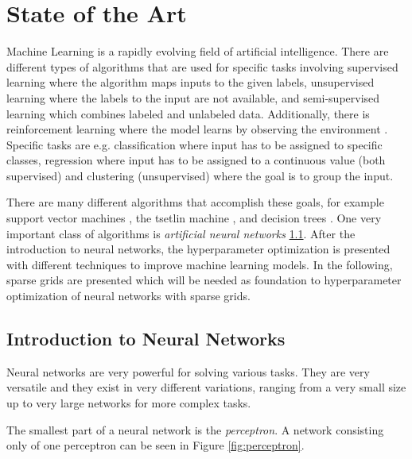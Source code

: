 
\chapter{State of the Art}\label{chapter:theoretical_background}

Machine Learning \cite{wang2016machine, mahesh2020machine} is a rapidly evolving field of artificial intelligence. There are different types of algorithms that are used for specific tasks involving supervised learning where the algorithm maps inputs to the given labels, unsupervised learning where the labels to the input are not available, and semi-supervised learning which combines labeled and unlabeled data. Additionally, there is reinforcement learning where the model learns by observing the environment \cite{ayodele2010types}. Specific tasks are e.g. classification where input has to be assigned to specific classes, regression where input has to be assigned to a continuous value (both supervised) and clustering (unsupervised) where the goal is to group the input. 

There are many different algorithms that accomplish these goals, for example support vector machines \cite{noble2006support}, the tsetlin machine \cite{granmo2018tsetlin}, and decision trees \cite{rokach2005decision}. One very important class of algorithms is \textit{artificial neural networks} \ref{sec:neural_networks}. After the introduction to neural networks, the hyperparameter optimization is presented with different techniques to improve machine learning models. In the following, sparse grids are presented which will be needed as foundation to hyperparameter optimization of neural networks with sparse grids. 

\section{Introduction to Neural Networks}\label{sec:neural_networks}

Neural networks \cite{bishop1994neural, da2017artificial} are very  powerful for solving various tasks. They are very versatile and they exist in very different variations, ranging from a very small size up to very large networks for more complex tasks.

The smallest part of a neural network is the \textit{perceptron}. A network consisting only of one perceptron can be seen in Figure \ref{fig:perceptron}.

